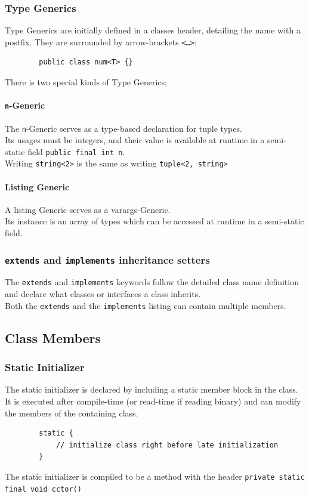 \documentclass{docs}
\begin{document}
    \subsubsection{Type Generics}
    Type Generics are initially defined in a classes header, detailing the name with a postfix.
    They are surrounded by arrow-brackets \texttt{<\dots>}:
    \begin{verbatim}
        public class num<T> {}
    \end{verbatim}
    There is two special kinds of Type Generics;
    
    \label{typeGenN}
    \paragraph{\texttt{n}-Generic} The \texttt{n}-Generic serves as a type-based declaration for tuple types. \\
    Its usages must be integers, and their value is available at runtime in a semi-static field \texttt{public final int n}. \\
    Writing \texttt{string<2>} is the same as writing \texttt{tuple<2, string>}
    
    \label{typeGenList}
    \paragraph{Listing Generic} A listing Generic serves as a varargs-Generic. \\
    Its instance is an array of types which can be accessed at runtime in a semi-static field.
    
    \subsubsection{\texttt{extends} and \texttt{implements} inheritance setters}
    The \texttt{extends} and \texttt{implements} keywords follow the detailed class name definition and declare what classes or interfaces a class inherits. \\
    Both the \texttt{extends} and the \texttt{implements} listing can contain multiple members.
    
    \subsection{Class Members}
    
    \subsubsection{Static Initializer}
    The static initializer is declared by including a static member block in the class. \\
    It is executed after compile-time (or read-time if reading binary) and can modify the members of the containing class.
    \begin{verbatim}
        static {
            // initialize class right before late initialization
        }
    \end{verbatim}
    The static initializer is compiled to be a method with the header \texttt{private static final void cctor()}
    
\end{document}
